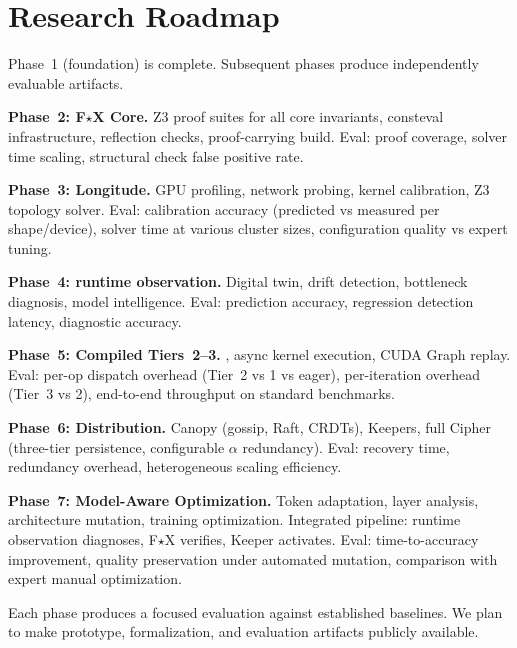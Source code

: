 
\section{Research Roadmap}\label{sec:roadmap}

Phase~1 (foundation) is complete.
Subsequent phases produce independently evaluable artifacts.

\textbf{Phase~2: F$\star$X Core.}
Z3 proof suites for all core invariants, consteval infrastructure, reflection checks, proof-carrying build.
Eval: proof coverage, solver time scaling, structural check false positive rate.

\textbf{Phase~3: Longitude.}
GPU profiling, network probing, kernel calibration, Z3 topology solver.
Eval: calibration accuracy (predicted vs measured per shape/device), solver time at various cluster sizes, configuration quality vs expert tuning.

\textbf{Phase~4: runtime observation.}
Digital twin, drift detection, bottleneck diagnosis, model intelligence.
Eval: prediction accuracy, regression detection latency, diagnostic accuracy.

\textbf{Phase~5: Compiled Tiers~2--3.}
, async kernel execution, CUDA Graph replay.
Eval: per-op dispatch overhead (Tier~2 vs 1 vs eager), per-iteration overhead (Tier~3 vs 2), end-to-end throughput on standard benchmarks.

\textbf{Phase~6: Distribution.}
Canopy (gossip, Raft, CRDTs), Keepers, full Cipher (three-tier persistence, configurable $\alpha$ redundancy).
Eval: recovery time, redundancy overhead, heterogeneous scaling efficiency.

\textbf{Phase~7: Model-Aware Optimization.}
Token adaptation, layer analysis, architecture mutation, training optimization.
Integrated pipeline: runtime observation diagnoses, F$\star$X verifies, Keeper activates.
Eval: time-to-accuracy improvement, quality preservation under automated mutation, comparison with expert manual optimization.

Each phase produces a focused evaluation against established baselines.
We plan to make prototype, formalization, and evaluation artifacts publicly available.
